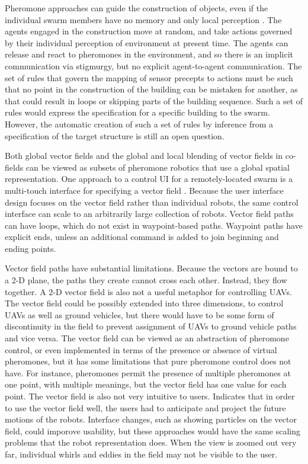 \documentclass[]{article}
\begin{document}
Pheromone approaches can guide the construction of objects, even if the individual swarm members have no memory and only local perception \cite{mason2003programming}. 
The agents engaged in the construction move at random, and take actions governed by their individual perception of environment at present time. 
The agents can release and react to pheromones in the environment, and so there is an implicit communication via stigmurgy, but no explicit agent-to-agent communication. 
The set of rules that govern the mapping of sensor precepts to actions must be such that no point in the construction of the building can be mistaken for another, as that could result in loops or skipping parts of the building sequence. 
Such a set of rules would express the specification for a specific building to the swarm. 
However, the automatic creation of such a set of rules by inference from a specification of the target structure is still an open question. 

Both global vector fields and the global and local blending of vector fields in co-fields can be viewed as subsets of pheromone robotics that use a global spatial representation. 
One approach to a control UI for a remotely-located swarm is a multi-touch interface for specifying a vector field \cite{Kato:2009:MIC:1520340.1520500}.
Because the user interface design focuses on the vector field rather than individual robots, the same control interface can scale to an arbitrarily large collection of robots. 
Vector field paths can have loops, which do not exist in waypoint-based paths. 
Waypoint paths have explicit ends, unless an additional command is added to join beginning and ending points. 

Vector field paths have substantial limitations. 
Because the vectors are bound to a 2-D plane, the paths they create cannot cross each other. 
Instead, they flow together. 
A 2-D vector field is also not a useful metaphor for controlling UAVs.
The vector field could be possibly extended into three dimensions, to control UAVs as well as ground vehicles, but there would have to be some form of discontinuity in the field to prevent assignment of UAVs to ground vehicle paths and vice versa. 
The vector field can be viewed as an abstraction of pheromone control, or even implemented in terms of the presence or absence of virtual pheromones, but it has some limitations that pure pheromone control does not have.
For instance, pheromones permit the presence of multiple pheromones at one point, with multiple meanings, but the vector field has one value for each point. 
The vector field is also not very intuitive to users. 
Indicates that in order to use the vector field well, the users had to anticipate and project the future motions of the robots. 
Interface changes, such as showing particles on the vector field, could imporove usability, but these approaches would have the same scaling problems that the robot representation does. 
When the view is zoomed out very far, individual whirls and eddies in the field may not be visible to the user. 
\end{document}
